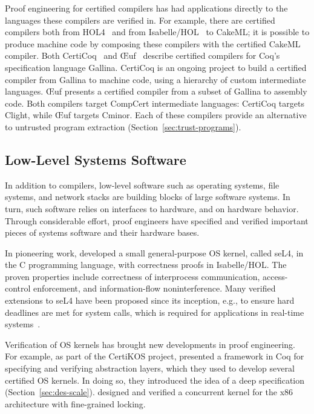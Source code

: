 Proof engineering for certified compilers has had applications directly to the languages these compilers are verified in.
For example, there are certified compilers both from HOL4~\citep{Myreen2012} and from Isabelle/HOL~\citep{Hupel2018}
to CakeML; it is possible to produce machine code by composing these compilers with the certified CakeML compiler.
Both CertiCoq~\citep{Anand2017} and \OE uf~\citep{Mullen2018} describe certified compilers for Coq's specification
language Gallina. CertiCoq is an ongoing project to build a certified compiler from Gallina to machine code, using a 
hierarchy of custom intermediate languages. \OE uf presents a certified compiler from a subset of Gallina to assembly code.
Both compilers target CompCert intermediate languages: CertiCoq targets Clight, while \OE uf targets Cminor.
Each of these compilers provide an alternative to untrusted program extraction (Section~\ref{sec:trust-programs}).

\subsection{Low-Level Systems Software}
\label{sec:systems-software}

In addition to compilers, low-level software such as operating systems, file systems, and network stacks are building blocks of large software systems. In turn, such software relies on interfaces to hardware, and on hardware behavior. Through considerable effort, proof engineers have specified and verified important pieces of systems software and their hardware bases.

In pioneering work, \cite{Klein2009,Klein2014micro} developed a small general-purpose OS kernel, called seL4, in the C programming language, with correctness proofs in Isabelle/HOL. The proven properties include correctness of interprocess communication, access-control enforcement, and information-flow noninterference. Many verified extensions to seL4 have been proposed since its inception, e.g., to ensure hard deadlines are met for system calls, which is required for applications in real-time systems~\citep{Sewell2017}.

Verification of OS kernels has brought new developments in proof engineering.
For example, as part of the CertiKOS project, \cite{Gu-al:POPL15} presented a framework in Coq for specifying and verifying abstraction layers, which they used to develop several certified OS kernels. In doing so, they introduced the idea of a deep specification (Section~\ref{sec:des-scale}). 
\cite{Gu-al:OSDI16} designed and verified a concurrent kernel for the x86 architecture with fine-grained locking.

